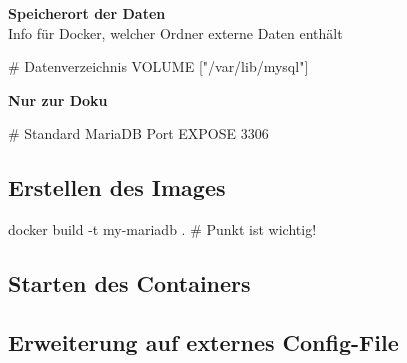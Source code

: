 \documentclass[
  ngerman,
  letterpaper,
  DIV=11]{scrreprt}
\newenvironment{Shaded}{\begin{snugshade}}{\end{snugshade}}
\newcommand{\AttributeTok}[1]{\textcolor[rgb]{0.40,0.45,0.13}{#1}}
\newcommand{\BuiltInTok}[1]{\textcolor[rgb]{0.00,0.23,0.31}{#1}}
\newcommand{\CommentTok}[1]{\textcolor[rgb]{0.37,0.37,0.37}{#1}}
\newcommand{\DataTypeTok}[1]{\textcolor[rgb]{0.68,0.00,0.00}{#1}}
\newcommand{\ExtensionTok}[1]{\textcolor[rgb]{0.00,0.23,0.31}{#1}}
\newcommand{\NormalTok}[1]{\textcolor[rgb]{0.00,0.23,0.31}{#1}}
\newcommand{\PreprocessorTok}[1]{\textcolor[rgb]{0.68,0.00,0.00}{#1}}
\newcommand{\StringTok}[1]{\textcolor[rgb]{0.13,0.47,0.30}{#1}}
\newcommand{\VariableTok}[1]{\textcolor[rgb]{0.07,0.07,0.07}{#1}}
\begin{document}
\textbf{Speicherort der Daten}\\
Info für Docker, welcher Ordner externe Daten enthält

\begin{Shaded}
\begin{Highlighting}[]
\CommentTok{\# Datenverzeichnis}
\ExtensionTok{VOLUME} \PreprocessorTok{[}\StringTok{"/var/lib/mysql"}\PreprocessorTok{]}
\end{Highlighting}
\end{Shaded}

\textbf{Nur zur Doku}

\begin{Shaded}
\begin{Highlighting}[]
\CommentTok{\# Standard MariaDB Port}
\ExtensionTok{EXPOSE}\NormalTok{ 3306}
\end{Highlighting}
\end{Shaded}

\subsection{Erstellen des Images}\label{erstellen-des-images}

\begin{Shaded}
\begin{Highlighting}[]
\ExtensionTok{docker}\NormalTok{ build }\AttributeTok{{-}t}\NormalTok{ my{-}mariadb .   }\CommentTok{\# Punkt ist wichtig!}
\end{Highlighting}
\end{Shaded}

\subsection{Starten des Containers}\label{starten-des-containers}

\begin{Shaded}
\end{Shaded}

\subsection{Erweiterung auf externes
Config-File}\label{erweiterung-auf-externes-config-file}
\end{document}
